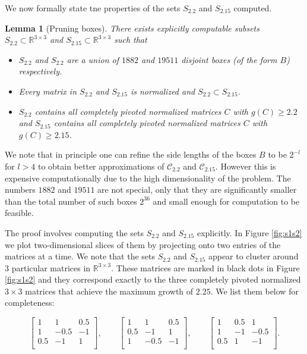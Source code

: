 \documentclass[reqno]{amsart}
\numberwithin{equation}{section}
\newcommand\R{\mathbb{R}}
\newtheorem{lemma}[theorem]{Lemma}
\begin{document}
    We now formally state tne properties of the sets $S_{2.2}$ and $S_{2.15}$ computed.
\begin{lemma}[Pruning boxes]
\label{lemma:box_covering_1}
    There exists explicitly computable subsets $S_{2.2} \subset \R^{3 \times 3}$ and $S_{2.15} \subset \R^{3 \times 3}$ such that 
    \begin{itemize}
        \item $S_{2.2}$ and $S_{2.2}$ are a union of $1882$ and $19511$ disjoint boxes (of the form $B$) respectively.
        \item Every matrix in $S_{2.2}$ and $S_{2.15}$ is normalized and $S_{2.2} \subset S_{2.15}$. 
        \item $S_{2.2}$ contains all completely pivoted normalized matrices $C$ with $g(C) \geq 2.2$ and $S_{2.15}$ contains all completely pivoted normalized matrices $C$ with $g(C) \geq 2.15$.
    \end{itemize}

\end{lemma}

We note that in principle one can refine the side lengths of the boxes $B$ to be $2^{-l}$ for $l > 4$ to obtain better approximations of $\mathcal{C}_{2.2}$ and $\mathcal{C}_{2.15}$. However this is expensive computationally due to the high dimensionality of the problem. The numbers $1882$ and $19511$ are not special, only that they are significantly smaller than the total number of such boxes $2^{36}$ and small enough for computation to be feasible.

The proof involves computing the sets $S_{2.2}$ and $S_{2.15}$ explicitly. In Figure \ref{fig:s1s2} we plot two-dimensional slices of them by projecting onto two entries of the matrices at a time. We note that the sets $S_{2.2}$ and $S_{2.15}$ appear to cluster around $3$ particular matrices in $\R^{3\times3}$. These matrices are marked in black dots in Figure \ref{fig:s1s2} and they correspond exactly to the three completely pivoted normalized $3 \times 3$ matrices that achieve the maximum growth of $2.25$. We list them below for completeness:

\begin{equation*}
    \begin{bmatrix}
1 & 1 & 0.5 \\
1 & -0.5 & -1 \\
0.5 & -1 & 1 \\
\end{bmatrix}, \qquad
\begin{bmatrix}
1 & 1 & 0.5 \\
0.5 & -1 & 1 \\
1 & -0.5 & -1 \\
\end{bmatrix}, \qquad
\begin{bmatrix}
1 & 0.5 & 1 \\
1 & -1 & -0.5 \\
0.5 & 1 & -1 \\
\end{bmatrix}.
\end{equation*}
\end{document}
